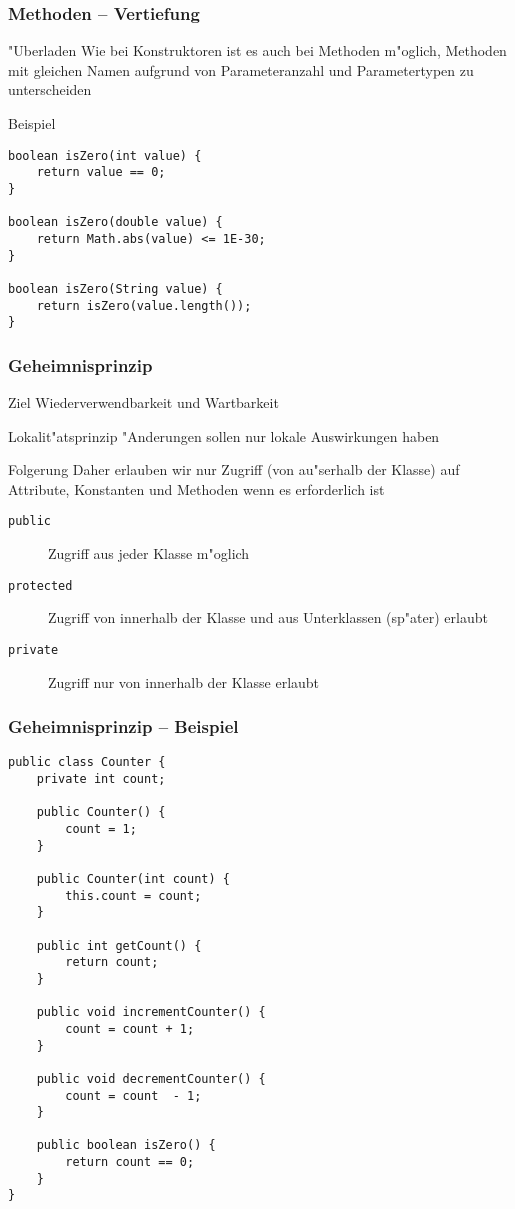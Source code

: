 \documentclass{beamer}
\begin{document}
\begin{frame}[containsverbatim]
\frametitle{Methoden -- Vertiefung}
\begin{block}{"Uberladen}
Wie bei Konstruktoren ist es auch bei Methoden m"oglich, Methoden mit gleichen Namen aufgrund von Parameteranzahl und Parametertypen zu unterscheiden 
\end{block}

\begin{block}{Beispiel}
\begin{lstlisting}
boolean isZero(int value) {
	return value == 0;
}

boolean isZero(double value) {
	return Math.abs(value) <= 1E-30;
}

boolean isZero(String value) {
	return isZero(value.length());
}
\end{lstlisting}
\end{block}
\end{frame}


\begin{frame}
\frametitle{Geheimnisprinzip}
\begin{block}{Ziel}
Wiederverwendbarkeit und Wartbarkeit
\end{block}

\pause

\begin{block}{Lokalit"atsprinzip}
"Anderungen sollen nur lokale Auswirkungen haben
\end{block}

\pause

\begin{block}{Folgerung}
Daher erlauben wir nur Zugriff (von au"serhalb der Klasse) auf Attribute, Konstanten und Methoden wenn es erforderlich ist
\begin{description}
\item[\texttt{public}] Zugriff aus jeder Klasse m"oglich
\item[\texttt{protected}] Zugriff von innerhalb der Klasse und aus Unterklassen (sp"ater) erlaubt
\item[\texttt{private}] Zugriff nur von innerhalb der Klasse erlaubt
\end{description}
\end{block}
\end{frame}


\begin{frame}[containsverbatim]
\frametitle{Geheimnisprinzip -- Beispiel}
\begin{lstlisting}
public class Counter {
	private int count;

	public Counter() {
		count = 1;
	}

	public Counter(int count) {
		this.count = count;
	}

	public int getCount() {
		return count;
	}

	public void incrementCounter() {
		count = count + 1;
	}

	public void decrementCounter() {
		count = count  - 1;
	}

	public boolean isZero() {
		return count == 0;
	}
}
\end{lstlisting}
\end{frame}
\end{document}
